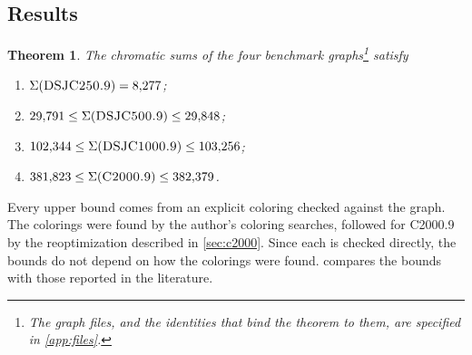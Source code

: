 \documentclass[11pt]{article}
\newtheorem{theorem}{Theorem}[section]
\theoremstyle{definition}
\newcommand{\DSJCTwoFifty}{\textnormal{\textsc{DSJC250.9}}}
\newcommand{\DSJCFiveHundred}{\textnormal{\textsc{DSJC500.9}}}
\newcommand{\DSJCThousand}{\textnormal{\textsc{DSJC1000.9}}}
\newcommand{\CTwoThousand}{\textnormal{\textsc{C2000.9}}}
\begin{document}
\subsection{Results}

\begin{theorem}
\label{thm:main-intro}
The chromatic sums of the four benchmark graphs\footnote{The graph files, and
the identities that bind the theorem to them, are specified in
\cref{app:files}.} satisfy
\begin{enumerate}[label=(\roman*)]
  \item $\Sigma(\DSJCTwoFifty)=8{,}277$;
  \item $29{,}791\le\Sigma(\DSJCFiveHundred)\le29{,}848$;
  \item $102{,}344\le\Sigma(\DSJCThousand)\le103{,}256$;
  \item $381{,}823\le\Sigma(\CTwoThousand)\le382{,}379$.
\end{enumerate}
\end{theorem}

Every upper bound comes from an explicit coloring checked against the graph.
The colorings were found by the author's coloring searches, followed for
\CTwoThousand{} by the reoptimization described in \cref{sec:c2000}. Since
each is checked directly, the bounds do not depend on how the colorings were
found.  compares the bounds with those reported in the
literature.
\end{document}
